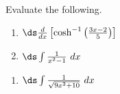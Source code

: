 {Evaluate the following.\\
\begin{minipage}[t]{.5\textwidth}
\begin{enumerate}
\item	$\ds \frac{d}{dx}\left[\cosh^{-1}\left(\frac{3x-2}{5}\right)\right]$
\item	$\ds \int\frac{1}{x^2-1}\ dx$
\end{enumerate}
\end{minipage}%
\begin{minipage}[t]{.5\textwidth}
\begin{enumerate}\addtocounter{enumi}{2}
\item	$\ds \int \frac{1}{\sqrt{9x^2+10}}\ dx$
\end{enumerate}
\end{minipage}
}
